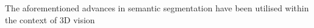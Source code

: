 The aforementioned advances in semantic segmentation have been utilised within the context of 3D vision